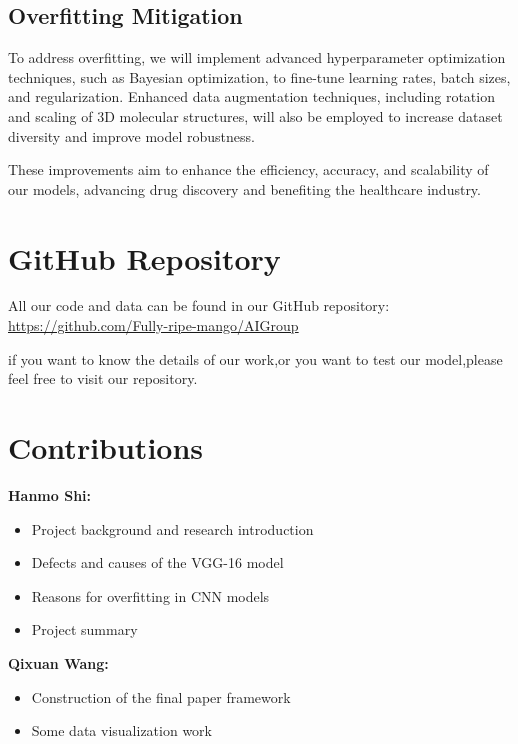 \documentclass{mcmthesis}
\begin{document}
\subsection{Overfitting Mitigation}
To address overfitting, we will implement advanced hyperparameter optimization techniques, such as Bayesian optimization, to fine-tune learning rates, batch sizes, and regularization. Enhanced data augmentation techniques, including rotation and scaling of 3D molecular structures, will also be employed to increase dataset diversity and improve model robustness.

These improvements aim to enhance the efficiency, accuracy, and scalability of our models, advancing drug discovery and benefiting the healthcare industry.\section{GitHub Repository}

All our code and data can be found in our GitHub repository: \url{https://github.com/Fully-ripe-mango/AIGroup}

if you want to know the details of our work,or you want to test our model,please feel free to visit our repository.
\section{Contributions}

\noindent \textbf{Hanmo Shi:}
\begin{itemize}
    \item Project background and research introduction
    \item Defects and causes of the VGG-16 model
    \item Reasons for overfitting in CNN models
    \item Project summary
\end{itemize}

\noindent \textbf{Qixuan Wang:}
\begin{itemize}
    \item Construction of the final paper framework
    \item Some data visualization work
\end{itemize}
\end{document}

